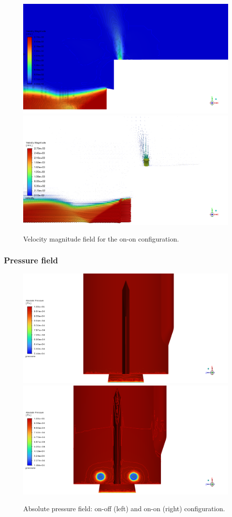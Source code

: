 \documentclass[12pt]{article}
\begin{document}
\begin{figure}[H]
    \centering
    \includegraphics[width=0.495\linewidth]{figs/t0s/vernier_zone_vabs.png}
    \includegraphics[width=0.495\linewidth]{figs/t0s/vernier_zone_vvabs.png}
    \caption{Velocity magnitude field for the on-on configuration.}
    \label{fig:pabs-conf-modes_t0s}
\end{figure}

\subsubsection*{Pressure field}

\begin{figure}[H]
    \centering
    \includegraphics[width=0.495\linewidth]{figs/t0s/vernier_zone_pabs_onoff.png}
    \includegraphics[width=0.495\linewidth]{figs/t0s/vernier_zone_pabs_onon.png}
    \caption{Absolute pressure field: on-off (left) and on-on (right) configuration.}
    \label{fig:pabs-conf-modes_t0s}
\end{figure}
\end{document}
